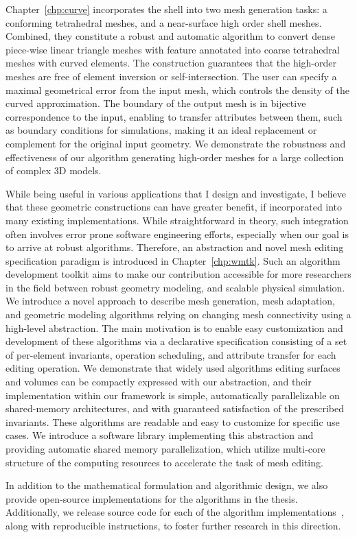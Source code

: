 %

Chapter~\ref*{chp:curve} incorporates the  shell into two mesh generation tasks: a conforming tetrahedral meshes, and a near-surface high order shell meshes. Combined, they constitute a robust and automatic algorithm to convert dense piece-wise linear triangle meshes with feature annotated into coarse tetrahedral meshes with curved elements. The construction guarantees that the high-order meshes are free of element inversion or self-intersection. 
The user can specify a maximal geometrical error from the input mesh, which  controls the density of the curved approximation. The boundary of the output mesh is in bijective correspondence to the input, enabling to transfer attributes between them, such as boundary conditions for simulations, making it an ideal replacement or complement for the original input geometry. We demonstrate the robustness and effectiveness of our algorithm generating high-order meshes for a large collection of complex 3D models.

While being useful in various applications that I design and investigate, I believe that these geometric constructions can have greater benefit, if incorporated into many existing implementations. While straightforward in theory, such integration often involves error prone software engineering efforts, especially when our goal is to arrive at robust algorithms. Therefore, an abstraction and novel mesh editing specification paradigm is introduced in Chapter~\ref*{chp:wmtk}. Such an algorithm development toolkit aims to make our contribution accessible for more researchers in the field between robust geometry modeling, and scalable physical simulation.
We introduce a novel approach to describe mesh generation, mesh adaptation, and geometric modeling algorithms relying on changing mesh connectivity using a high-level abstraction. The main motivation is to enable easy customization and development of these algorithms via a declarative specification consisting of a set of per-element invariants, operation scheduling, and attribute transfer for each editing operation.
We demonstrate that widely used algorithms editing surfaces and volumes can be compactly expressed with our abstraction, and their implementation within our framework is simple, automatically parallelizable on shared-memory architectures, and with guaranteed satisfaction of the prescribed invariants. These algorithms are readable and easy to customize for specific use cases.
We introduce a software library implementing this abstraction and providing automatic shared memory parallelization, which utilize multi-core structure of the computing resources to accelerate the task of mesh editing.

In addition to the mathematical formulation and algorithmic design, we also provide open-source implementations for the algorithms in the thesis.
Additionally, we release source code for each of the algorithm implementations~\cite{githubScaffoldMap,githubshell,githubbichon}, along with reproducible instructions, to foster further research in this direction.
